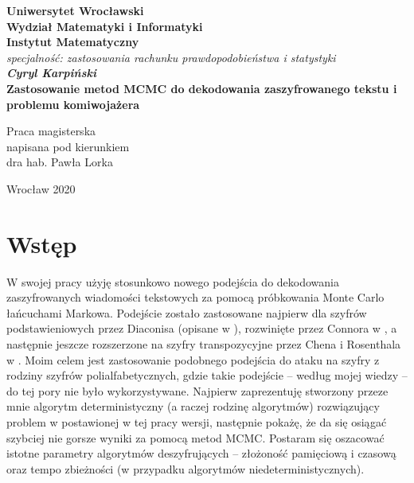 \documentclass[a4paper]{article}
\theoremstyle{defn}
\theoremstyle{theorem}
\theoremstyle{lemma}
\theoremstyle{cor}
\theoremstyle{fact}
\begin{document}
\lstset{language=Python}  

\newpage
\thispagestyle{empty}
\begin{center}
\textbf{\large Uniwersytet Wrocławski\\
Wydział Matematyki i Informatyki\\
Instytut Matematyczny}\\
\textit{\large specjalność: zastosowania rachunku prawdopodobieństwa i statystyki}\\
\vspace{4cm}
\textbf{\textit{\large Cyryl Karpiński}\\
\vspace{0.5cm}
{\Large Zastosowanie metod MCMC do dekodowania zaszyfrowanego tekstu
i problemu komiwojażera}}\\
\end{center}
\vspace{3cm}
{\large \hspace*{6.5cm}Praca magisterska\\
\hspace*{6.5cm}napisana pod kierunkiem\\
\hspace*{6.5cm}dra hab. Pawła Lorka}\\
\vfill
\begin{center}
{\large Wrocław 2020}\\
\end{center}

\newpage
\tableofcontents
\newpage
\section{Wstęp}
W swojej pracy użyję stosunkowo nowego podejścia do dekodowania zaszyfrowanych wiadomości tekstowych za pomocą próbkowania Monte Carlo łańcuchami Markowa. Podejście zostało zastosowane najpierw dla szyfrów podstawieniowych przez Diaconisa (opisane w \cite{Diaconis}), rozwinięte przez Connora w \cite{Connor}, a następnie jeszcze rozszerzone na szyfry transpozycyjne przez Chena i Rosenthala w \cite{Chen&Rosenthal}. Moim celem jest zastosowanie podobnego podejścia do ataku na szyfry z rodziny szyfrów polialfabetycznych, gdzie takie podejście – według mojej wiedzy – do tej pory nie było wykorzystywane. Najpierw zaprezentuję stworzony przeze mnie algorytm deterministyczny (a raczej rodzinę algorytmów) rozwiązujący problem w postawionej w tej pracy wersji, następnie pokażę, że da się osiągać szybciej nie gorsze wyniki za pomocą metod MCMC. Postaram się oszacować istotne parametry algorytmów deszyfrujących – złożoność pamięciową i czasową oraz tempo zbieżności (w przypadku algorytmów niedeterministycznych).
\end{document}
